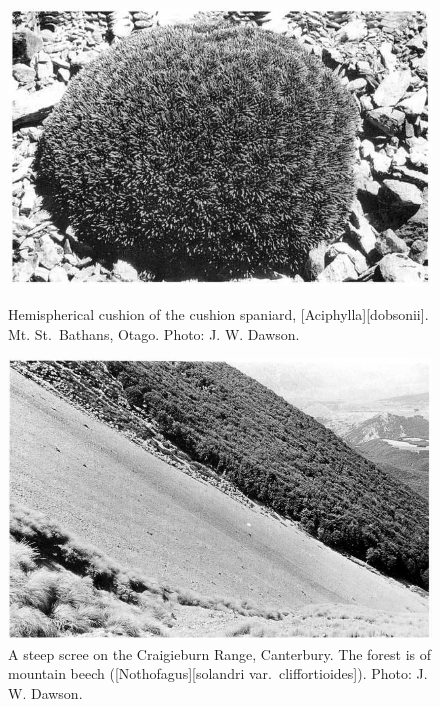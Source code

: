\begin{figure}[htb]
	\centering
	\begin{minipage}[t]{0.493\textwidth}
		\centering
		\includegraphics[width=\textwidth]{graphics/figure110cushion-spaniard.jpg}
    	\caption[Hemispherical cushion of the cushion spaniard]{Hemispherical cushion of the cushion spaniard, [Aciphylla][dobsonii].
    	Mt. St.\ Bathans, Otago.
    	Photo: J. W. Dawson.}%
    	\label{fig:110cushion-spaniard}
	\end{minipage}\hfill%
	\begin{minipage}[t]{0.487\textwidth}
    	\centering
    	\includegraphics[width=\textwidth]{graphics/figure111craigieburn.jpg}
    	\caption[A steep scree on the Craigieburn Range]{A steep scree on the Craigieburn Range, Canterbury.
    	The forest is of mountain beech ([Nothofagus][solandri var.\ cliffortioides]).
    	Photo: J. W. Dawson.}%
    	\label{fig:111craigieburn}
	\end{minipage}
\end{figure}

